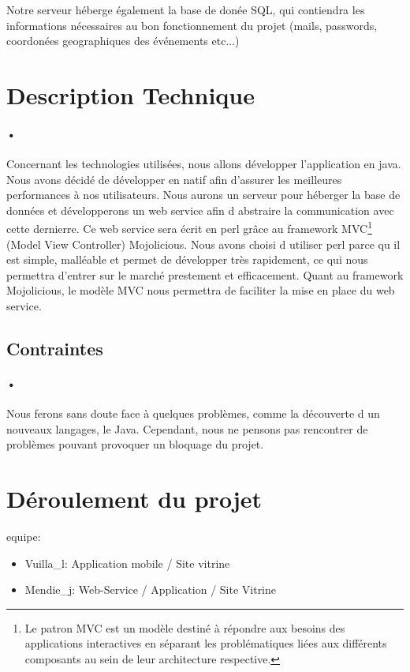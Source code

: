 \documentclass[pdftex,12pt,a4paper]{article}
\begin{document}
Notre serveur h\'eberge \'egalement la base de don\'ee SQL, qui contiendra les informations n\'ecessaires au bon fonctionnement du projet (mails, passwords, coordon\'ees geographiques des \'ev\'enements etc...)

\newpage
\section{Description Technique}
\paragraph{•}
Concernant les technologies utilis\'ees, nous allons d\'evelopper l'application en java. Nous avons d\'ecid\'e de d\'evelopper en natif afin d'assurer les meilleures performances à nos utilisateurs.
Nous aurons un serveur pour h\'eberger la base de donn\'ees et d\'evelopperons un web service afin d abstraire la communication avec cette dernierre. Ce web service sera \'ecrit en perl gr\^ace au framework MVC\footnote{ Le patron MVC est un mod\`ele destin\'e \`a r\'epondre aux besoins des applications interactives en s\'eparant les probl\'ematiques li\'ees aux diff\'erents composants au sein de leur architecture respective.} (Model View Controller) Mojolicious. Nous avons choisi d utiliser perl parce qu il est simple, mall\'eable et permet de développer tr\`es rapidement, ce qui nous permettra d’entrer sur le march\'e prestement et efficacement. 
Quant au framework Mojolicious, le mod\`ele MVC nous permettra de faciliter la mise en place du web service.

\subsection{Contraintes}
\paragraph{•}
Nous ferons sans doute face \`a quelques probl\`emes, comme la d\'ecouverte d un nouveaux langages, le Java. Cependant, nous ne pensons pas rencontrer de probl\`emes pouvant provoquer un bloquage du projet.

\section{D\'eroulement du projet}
equipe:
\begin{itemize}
\item Vuilla\_l: Application mobile / Site vitrine
\item Mendie\_j: Web-Service / Application / Site Vitrine
\end{itemize}
\end{document}
